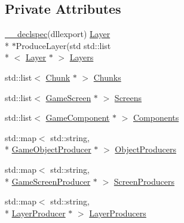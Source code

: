 \subsection*{Private Attributes}
\begin{DoxyCompactItemize}
\item 
\hyperlink{class_game_factory_adaa8f1b9fe44c066743b786d1cd71bfb}{\-\_\-\-\_\-declspec}(dllexport) \hyperlink{class_layer}{Layer} \\*
$\ast$Produce\-Layer(std std\-::list\\*
$<$ \hyperlink{class_layer}{Layer} $\ast$ $>$ \hyperlink{class_game_factory_aeb0d338957100663811acae5074943ac}{Layers}
\item 
std\-::list$<$ \hyperlink{class_chunk}{Chunk} $\ast$ $>$ \hyperlink{class_game_factory_a77496a7ea1e2fa54acb18c499b3bd3bb}{Chunks}
\item 
std\-::list$<$ \hyperlink{class_game_screen}{Game\-Screen} $\ast$ $>$ \hyperlink{class_game_factory_a16a8135f6d6b1b60c0d08b39340b34cc}{Screens}
\item 
std\-::list$<$ \hyperlink{class_game_component}{Game\-Component} $\ast$ $>$ \hyperlink{class_game_factory_a90fc6360610babaf3d2d880f782772b3}{Components}
\item 
std\-::map$<$ std\-::string, \\*
\hyperlink{class_game_object_producer}{Game\-Object\-Producer} $\ast$ $>$ \hyperlink{class_game_factory_ab72819fc3f241243d44827f75e0a2886}{Object\-Producers}
\item 
std\-::map$<$ std\-::string, \\*
\hyperlink{class_game_screen_producer}{Game\-Screen\-Producer} $\ast$ $>$ \hyperlink{class_game_factory_aa65ba67e6c3fc56ec228c801e02352c8}{Screen\-Producers}
\item 
std\-::map$<$ std\-::string, \\*
\hyperlink{class_layer_producer}{Layer\-Producer} $\ast$ $>$ \hyperlink{class_game_factory_adfadca1996a3982f4b45c67ced1520f2}{Layer\-Producers}
\end{DoxyCompactItemize}


